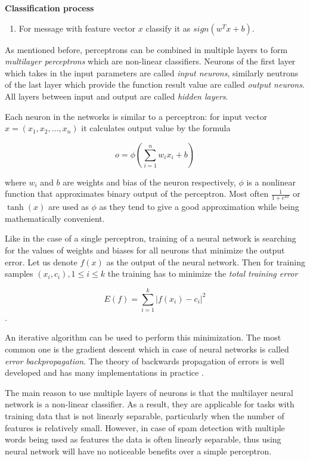 \documentclass[12pt]{report}
\begin{document}
\textbf{Classification process}

\begin{enumerate}
	\item For message with feature vector $x$ classify it as $sign(w^Tx + b)$.
\end{enumerate}

As mentioned before, perceptrons can be combined in multiple layers to form \textit{multilayer perceptrons} which are non-linear classifiers. Neurons of the first layer which takes in the input parameters are called \textit{input neurons}, similarly neutrons of the last layer which provide the function result value are called \textit{output neurons}. All layers between input and output are called \textit{hidden layers}.

Each neuron in the networks is similar to a perceptron: for input vector $x = (x_1, x_2, \dots, x_n)$ it calculates output value by the formula

$$o = \phi(\sum_{i = 1}^{n}w_i x_i + b)$$

where $w_i$ and $b$ are weights and bias of the neuron respectively, $\phi$ is a nonlinear function that approximates binary output of the perceptron. Most often $\frac{1}{1 + e^{ax}}$ or $\tanh(x)$ are used as $\phi$ as they tend to give a good approximation while being mathematically convenient.

Like in the case of a single perceptron, training of a neural network is searching for the values of weights and biases for all neurons that minimize the output error. Let us denote $f(x)$ as the output of the neural network. Then for training samples $(x_i, c_i), 1 \leq i \leq k$ the training has to minimize the \textit{total training error}

$$E(f) = \sum_{i = 1}^{k}|f(x_i) - c_i|^2$$.

An iterative algorithm can be used to perform this minimization. The most common one is the gradient descent which in case of neural networks is called \textit{error backpropagation}. The theory of backwards propagation of errors is well developed and has many implementations in practice \cite{Haykin}.

The main reason to use multiple layers of neurons is that the multilayer neural network is a non-linear classifier. As a result, they are applicable for tasks with training data that is not linearly separable, particularly when the number of features is relatively small. However, in case of spam detection with multiple words being used as features the data is often linearly separable, thus using neural network will have no noticeable benefits over a simple perceptron.
\end{document}
